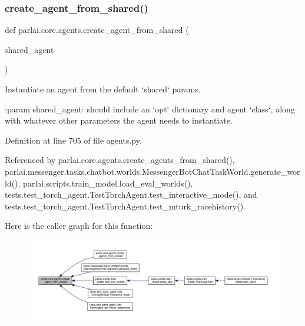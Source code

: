 \subsubsection{\texorpdfstring{create\+\_\+agent\+\_\+from\+\_\+shared()}{create\_agent\_from\_shared()}}
{\footnotesize\ttfamily def parlai.\+core.\+agents.\+create\+\_\+agent\+\_\+from\+\_\+shared (\begin{DoxyParamCaption}\item[{}]{shared\+\_\+agent }\end{DoxyParamCaption})}

\begin{DoxyVerb}Instantiate an agent from the default `shared` params.

:param shared_agent:
    should include an `opt` dictionary and agent `class`, along with
    whatever other parameters the agent needs to instantiate.
\end{DoxyVerb}
 

Definition at line 705 of file agents.\+py.



Referenced by parlai.\+core.\+agents.\+create\+\_\+agents\+\_\+from\+\_\+shared(), parlai.\+messenger.\+tasks.\+chatbot.\+worlds.\+Messenger\+Bot\+Chat\+Task\+World.\+generate\+\_\+world(), parlai.\+scripts.\+train\+\_\+model.\+load\+\_\+eval\+\_\+worlds(), tests.\+test\+\_\+torch\+\_\+agent.\+Test\+Torch\+Agent.\+test\+\_\+interactive\+\_\+mode(), and tests.\+test\+\_\+torch\+\_\+agent.\+Test\+Torch\+Agent.\+test\+\_\+mturk\+\_\+racehistory().

Here is the caller graph for this function\+:
\nopagebreak
\begin{figure}[H]
\begin{center}
\leavevmode
\includegraphics[width=350pt]{namespaceparlai_1_1core_1_1agents_aa5af5dd1d2f9da491b60348d479b849f_icgraph}
\end{center}
\end{figure}
\mbox{\label{namespaceparlai_1_1core_1_1agents_a5600530545f5e60a79e2d657b5af1d8c}} 

